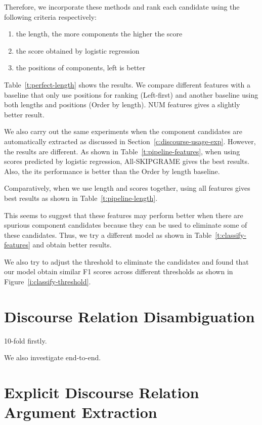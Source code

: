 

Therefore, we incorporate these methods and rank each candidate using the following
criteria respectively:

\begin{enumerate}
    \item the length, the more components the higher the score
    \item the score obtained by logistic regression
    \item the positions of components, left is better
\end{enumerate}

Table~\ref{t:perfect-length} shows the results. We compare different features
with a baseline that only use positions for ranking (Left-first) and another
baseline using both lengths and positions (Order by length). NUM features gives
a slightly better result.



We also carry out the same experiments when the component candidates are automatically
extracted as discussed in Section~\ref{c:discourse-usage-exp}. However, the results
are different. As shown in Table~\ref{t:pipeline-features}, when using scores
predicted by logistic regression, All-SKIPGRAME gives the best results. Also,
the its performance is better than the Order by length baseline.



Comparatively, when we use length and scores together, using all features gives
best results as shown in Table~\ref{t:pipeline-length}.



This seems to suggest that these features may perform better when there are
spurious component candidates because they can be used to eliminate some of
these candidates.  Thus, we try a different model as shown in
Table~\ref{t:classify-features} and obtain better results.



We also try to adjust the threshold to eliminate the candidates and found
that our model obtain similar F1 scores across different thresholds as
shown in Figure~\ref{i:classify-threshold}.



\section{Discourse Relation Disambiguation}

10-fold firstly.

We also investigate end-to-end.


\section{Explicit Discourse Relation Argument Extraction}
